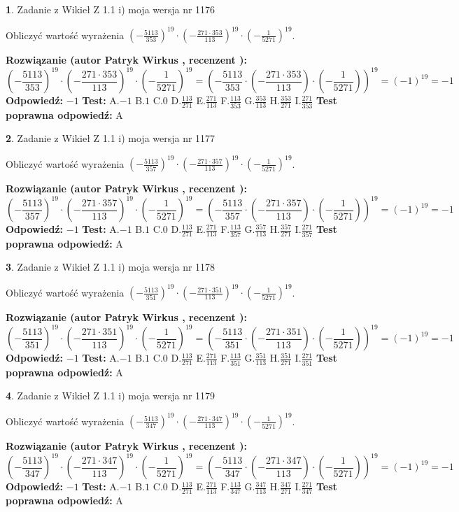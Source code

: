 \documentclass[12pt, a4paper]{article}
\theoremstyle{definition} %
\newtheorem{zad}{}
\newcommand{\zadStart}[1]{\begin{zad}#1\newline}
\newcommand{\zadStop}{\end{zad}}
\newcommand{\rozwStart}[2]{\noindent \textbf{Rozwiązanie (autor #1 , recenzent #2): }\newline}
\newcommand{\rozwStop}{\newline}
\newcommand{\odpStart}{\noindent \textbf{Odpowiedź:}\newline}
\newcommand{\odpStop}{\newline}
\newcommand{\testStart}{\noindent \textbf{Test:}\newline}
\newcommand{\testStop}{\newline}
\newcommand{\kluczStart}{\noindent \textbf{Test poprawna odpowiedź:}\newline}
\newcommand{\kluczStop}{\newline}
\begin{document}
\zadStart{Zadanie z Wikieł Z 1.1 i) moja wersja nr 1176}

Obliczyć wartość wyrażenia $(-\frac{5113}{353})^{19} \cdot (-\frac{271 \cdot 353}{113})^{19} \cdot (-\frac{1}{5271})^{19}$.
\zadStop
\rozwStart{Patryk Wirkus}{}
$$(-\frac{5113}{353})^{19} \cdot (-\frac{271 \cdot 353}{113})^{19} \cdot (-\frac{1}{5271})^{19} = (-\frac{5113}{353} \cdot (-\frac{271 \cdot 353}{113}) \cdot (-\frac{1}{5271}))^{19} = (-1)^{19} = -1$$
\rozwStop
\odpStart
$-1$
\odpStop
\testStart
A.$-1$ B.$1$ C.$0$ D.$\frac{113}{271}$ E.$\frac{271}{113}$
F.$\frac{113}{353}$ G.$\frac{353}{113}$
H.$\frac{353}{271}$
I.$\frac{271}{353}$
\testStop
\kluczStart
A
\kluczStop



\zadStart{Zadanie z Wikieł Z 1.1 i) moja wersja nr 1177}

Obliczyć wartość wyrażenia $(-\frac{5113}{357})^{19} \cdot (-\frac{271 \cdot 357}{113})^{19} \cdot (-\frac{1}{5271})^{19}$.
\zadStop
\rozwStart{Patryk Wirkus}{}
$$(-\frac{5113}{357})^{19} \cdot (-\frac{271 \cdot 357}{113})^{19} \cdot (-\frac{1}{5271})^{19} = (-\frac{5113}{357} \cdot (-\frac{271 \cdot 357}{113}) \cdot (-\frac{1}{5271}))^{19} = (-1)^{19} = -1$$
\rozwStop
\odpStart
$-1$
\odpStop
\testStart
A.$-1$ B.$1$ C.$0$ D.$\frac{113}{271}$ E.$\frac{271}{113}$
F.$\frac{113}{357}$ G.$\frac{357}{113}$
H.$\frac{357}{271}$
I.$\frac{271}{357}$
\testStop
\kluczStart
A
\kluczStop



\zadStart{Zadanie z Wikieł Z 1.1 i) moja wersja nr 1178}

Obliczyć wartość wyrażenia $(-\frac{5113}{351})^{19} \cdot (-\frac{271 \cdot 351}{113})^{19} \cdot (-\frac{1}{5271})^{19}$.
\zadStop
\rozwStart{Patryk Wirkus}{}
$$(-\frac{5113}{351})^{19} \cdot (-\frac{271 \cdot 351}{113})^{19} \cdot (-\frac{1}{5271})^{19} = (-\frac{5113}{351} \cdot (-\frac{271 \cdot 351}{113}) \cdot (-\frac{1}{5271}))^{19} = (-1)^{19} = -1$$
\rozwStop
\odpStart
$-1$
\odpStop
\testStart
A.$-1$ B.$1$ C.$0$ D.$\frac{113}{271}$ E.$\frac{271}{113}$
F.$\frac{113}{351}$ G.$\frac{351}{113}$
H.$\frac{351}{271}$
I.$\frac{271}{351}$
\testStop
\kluczStart
A
\kluczStop



\zadStart{Zadanie z Wikieł Z 1.1 i) moja wersja nr 1179}

Obliczyć wartość wyrażenia $(-\frac{5113}{347})^{19} \cdot (-\frac{271 \cdot 347}{113})^{19} \cdot (-\frac{1}{5271})^{19}$.
\zadStop
\rozwStart{Patryk Wirkus}{}
$$(-\frac{5113}{347})^{19} \cdot (-\frac{271 \cdot 347}{113})^{19} \cdot (-\frac{1}{5271})^{19} = (-\frac{5113}{347} \cdot (-\frac{271 \cdot 347}{113}) \cdot (-\frac{1}{5271}))^{19} = (-1)^{19} = -1$$
\rozwStop
\odpStart
$-1$
\odpStop
\testStart
A.$-1$ B.$1$ C.$0$ D.$\frac{113}{271}$ E.$\frac{271}{113}$
F.$\frac{113}{347}$ G.$\frac{347}{113}$
H.$\frac{347}{271}$
I.$\frac{271}{347}$
\testStop
\kluczStart
A
\kluczStop
\end{document}
